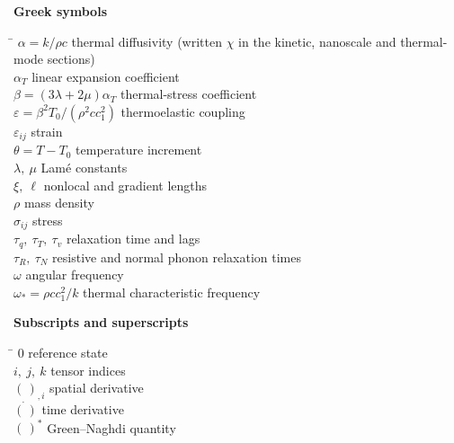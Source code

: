 \medskip\noindent\textbf{Greek symbols}
\begin{tabbing}
\hspace{3.2cm}\=\kill
$\alpha=k/\rho c$ \> thermal diffusivity (written $\chi$ in the kinetic, nanoscale and thermal-mode sections)\\
$\alpha_T$ \> linear expansion coefficient\\
$\beta=(3\lambda+2\mu)\alpha_T$ \> thermal-stress coefficient\\
$\varepsilon=\beta^2T_0/(\rho^2cc_1^2)$ \> thermoelastic coupling\\
$\varepsilon_{ij}$ \> strain\\
$\theta=T-T_0$ \> temperature increment\\
$\lambda,\ \mu$ \> Lam\'e constants\\
$\xi,\ \ell$ \> nonlocal and gradient lengths\\
$\rho$ \> mass density\\
$\sigma_{ij}$ \> stress\\
$\tau_q,\ \tau_T,\ \tau_v$ \> relaxation time and lags\\
$\tau_R,\ \tau_N$ \> resistive and normal phonon relaxation times\\
$\omega$ \> angular frequency\\
$\omega_*=\rho cc_1^2/k$ \> thermal characteristic frequency\\
\end{tabbing}

\medskip\noindent\textbf{Subscripts and superscripts}
\begin{tabbing}
\hspace{3.2cm}\=\kill
$0$ \> reference state\\
$i,\ j,\ k$ \> tensor indices\\
$(\,)_{,i}$ \> spatial derivative\\
$\dot{(\,)}$ \> time derivative\\
$(\,)^*$ \> Green--Naghdi quantity\\
\end{tabbing}
